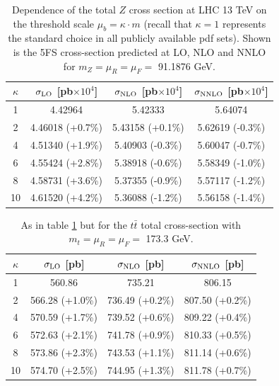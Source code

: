 \documentclass[letter,11pt]{article}
\def\mub{\mu_b}
\def\k{\kappa}
\begin{document}
%
\begin{table}[t]
\centering
\begin{tabular}{c|c|c|c}
$\k$ & $\sigma_{\rm LO}$ [pb$\times 10^4$] & $\sigma_{\rm NLO}$ [pb$\times 10^4$] & $\sigma_{\rm NNLO}$ [pb$\times 10^4$]\\
\hline
1  & 4.42964 \phantom{(+0.7\%)} & 5.42333 \phantom{(+0.7\%)} & 5.64074 \phantom{(+0.7\%)} \\
2  & 4.46018 (+0.7\%)           & 5.43158 (+0.1\%)           & 5.62619 (-0.3\%)           \\
4  & 4.51340 (+1.9\%)           & 5.40903 (-0.3\%)           & 5.60047 (-0.7\%)           \\
6  & 4.55424 (+2.8\%)           & 5.38918 (-0.6\%)           & 5.58349 (-1.0\%)           \\
8  & 4.58731 (+3.6\%)           & 5.37355 (-0.9\%)           & 5.57117 (-1.2\%)           \\
10 & 4.61520 (+4.2\%)           & 5.36088 (-1.2\%)           & 5.56158 (-1.4\%)           \\
\hline
\end{tabular}
\caption{Dependence of the total $Z$ cross section at LHC 13 TeV on the threshold scale $\mub=\k\cdot m$ (recall that $\k=1$ represents the standard choice in all publicly available pdf sets). Shown is the 5FS cross-section predicted at LO, NLO and NNLO for $m_Z=\mu_R=\mu_F=$ 91.1876 GeV.}
\label{tab:Zincl}
\end{table}
%
%
\begin{table}[t]
\centering
\vskip 1mm
\begin{tabular}{c|c|c|c}
$\k$ & $\sigma_{\rm LO}$ [pb] & $\sigma_{\rm NLO}$ [pb] & $\sigma_{\rm NNLO}$ [pb]\\
\hline
1  & 560.86 \phantom{(+0.7\%)} & 735.21 \phantom{(+0.7\%)} & 806.15 \phantom{(+0.7\%)} \\
2  & 566.28 (+1.0\%)           & 736.49 (+0.2\%)           & 807.50 (+0.2\%)           \\
4  & 570.59 (+1.7\%)           & 739.52 (+0.6\%)           & 809.22 (+0.4\%)           \\
6  & 572.63 (+2.1\%)           & 741.78 (+0.9\%)           & 810.33 (+0.5\%)           \\
8  & 573.86 (+2.3\%)           & 743.53 (+1.1\%)           & 811.14 (+0.6\%)           \\
10 & 574.70 (+2.5\%)           & 744.95 (+1.3\%)           & 811.78 (+0.7\%)           \\
\hline
\end{tabular}
\caption{As in table \ref{tab:Zincl} but for the $t\bar{t}$ total cross-section with $m_t=\mu_R=\mu_F=$ 173.3 GeV.}
\label{tab:ttincl}
\end{table}
\end{document}

